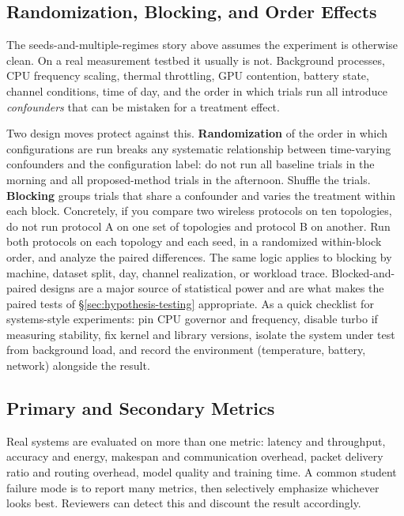 \documentclass[11pt]{article}
\begin{document}
\subsection{Randomization, Blocking, and Order Effects}
\label{sec:randomization}

The seeds-and-multiple-regimes story above assumes the experiment is otherwise clean. On a real measurement testbed it usually is not. Background processes, CPU frequency scaling, thermal throttling, GPU contention, battery state, channel conditions, time of day, and the order in which trials run all introduce \emph{confounders} that can be mistaken for a treatment effect.

Two design moves protect against this. \textbf{Randomization} of the order in which configurations are run breaks any systematic relationship between time-varying confounders and the configuration label: do not run all baseline trials in the morning and all proposed-method trials in the afternoon. Shuffle the trials. \textbf{Blocking} groups trials that share a confounder and varies the treatment within each block. Concretely, if you compare two wireless protocols on ten topologies, do not run protocol A on one set of topologies and protocol B on another. Run both protocols on each topology and each seed, in a randomized within-block order, and analyze the paired differences. The same logic applies to blocking by machine, dataset split, day, channel realization, or workload trace. Blocked-and-paired designs are a major source of statistical power and are what makes the paired tests of \S\ref{sec:hypothesis-testing} appropriate. As a quick checklist for systems-style experiments: pin CPU governor and frequency, disable turbo if measuring stability, fix kernel and library versions, isolate the system under test from background load, and record the environment (temperature, battery, network) alongside the result.

\subsection{Primary and Secondary Metrics}
\label{sec:primary-metric}

Real systems are evaluated on more than one metric: latency and throughput, accuracy and energy, makespan and communication overhead, packet delivery ratio and routing overhead, model quality and training time. A common student failure mode is to report many metrics, then selectively emphasize whichever looks best. Reviewers can detect this and discount the result accordingly.
\end{document}
